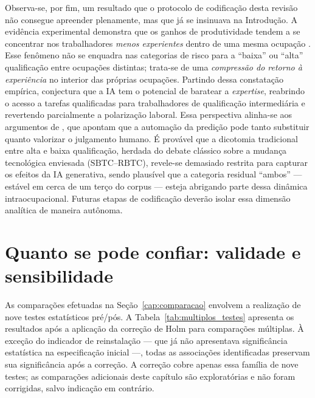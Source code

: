Observa-se, por fim, um resultado que o protocolo de codificação desta revisão não consegue apreender plenamente, mas que já se insinuava na Introdução. A evidência experimental demonstra que os ganhos de produtividade tendem a se concentrar nos trabalhadores \emph{menos experientes} dentro de uma mesma ocupação \parencite{noyZhang2023, brynjolfssonLiRaymond2025}. Esse fenômeno não se enquadra nas categorias de risco para a ``baixa'' ou ``alta'' qualificação entre ocupações distintas; trata-se de uma \emph{compressão do retorno à experiência} no interior das próprias ocupações. Partindo dessa constatação empírica, \textcite{autor2024rebuild} conjectura que a IA tem o potencial de baratear a \emph{expertise}, reabrindo o acesso a tarefas qualificadas para trabalhadores de qualificação intermediária e revertendo parcialmente a polarização laboral. Essa perspectiva alinha-se aos argumentos de \textcite{agrawalGansGoldfarb2019}, que apontam que a automação da predição pode tanto substituir quanto valorizar o julgamento humano. É provável que a dicotomia tradicional entre alta e baixa qualificação, herdada do debate clássico sobre a mudança tecnológica enviesada ($\text{SBTC--RBTC}$), revele-se demasiado restrita para capturar os efeitos da IA generativa, sendo plausível que a categoria residual ``ambos'' --- estável em cerca de um terço do corpus --- esteja abrigando parte dessa dinâmica intraocupacional. Futuras etapas de codificação deverão isolar essa dimensão analítica de maneira autônoma.


\section{Quanto se pode confiar: validade e sensibilidade}

As comparações efetuadas na Seção~\ref{cap:comparacao} envolvem a realização de nove testes estatísticos pré/pós. A Tabela~\ref{tab:multiplos_testes} apresenta os resultados após a aplicação da correção de Holm para comparações múltiplas. À exceção do indicador de reinstalação --- que já não apresentava significância estatística na especificação inicial ---, todas as associações identificadas preservam sua significância após a correção. A correção cobre apenas essa família de nove testes; as comparações adicionais deste capítulo são exploratórias e não foram corrigidas, salvo indicação em contrário.

\begin{table}[htbp]
\centering
\caption{Testes pré/pós com correção para comparações múltiplas.}
\label{tab:multiplos_testes}

\end{table}

